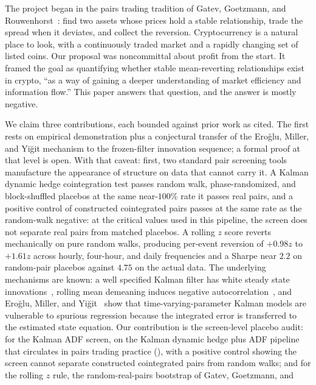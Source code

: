 \documentclass[11pt]{article}
\begin{document}
The project began in the pairs trading tradition of Gatev, Goetzmann, and
Rouwenhorst~\cite{gatev2006pairs}: find two assets whose prices hold a stable relationship, trade the
spread when it deviates, and collect the reversion. Cryptocurrency is a natural place to look,
with a continuously traded market and a rapidly changing set of listed coins. Our proposal was noncommittal about profit from the start. It framed the goal as quantifying whether stable mean-reverting
relationships exist in crypto, ``as a way of gaining a deeper understanding of market efficiency
and information flow.'' This paper answers that question, and the answer is mostly negative.

We claim three contributions, each bounded against prior work as cited. The first rests on
empirical demonstration plus a conjectural transfer of the Ero\u{g}lu, Miller, and Yi\u{g}it
mechanism to the frozen-filter innovation sequence; a formal proof at that level is
open. With that caveat: first, two standard pair screening tools manufacture the appearance of
structure on data that cannot carry it. A Kalman dynamic hedge cointegration test passes
random walk, phase-randomized, and block-shuffled placebos at the same near-$100\%$ rate it
passes real pairs, and a positive control of constructed cointegrated pairs passes at the
same rate as the random-walk negative: at the critical values used in this pipeline, the screen
does not separate real pairs from matched placebos. A rolling $z$ score reverts mechanically on pure random walks, producing
per-event reversion of $+0.98z$ to $+1.61z$ across hourly, four-hour, and daily frequencies
and a Sharpe near $2.2$ on random-pair placebos against $4.75$ on the actual data. The
underlying mechanisms are known: a well specified Kalman filter has white steady state
innovations~\cite{harvey1989structural}, rolling mean demeaning induces negative
autocorrelation~\cite{working1960correlation, cochrane1988random}, and Ero\u{g}lu, Miller,
and Yi\u{g}it~\cite{eroglu2022tvc} show that time-varying-parameter Kalman models are
vulnerable to spurious regression because the integrated error is transferred to the
estimated state equation. Our contribution is the screen-level placebo audit: for the
Kalman ADF screen, on the Kalman dynamic hedge plus ADF pipeline that circulates in pairs
trading practice (\cite{vidyamurthy2004pairs, elliott2005pairs,
triantafyllopoulos2011dynamic}), with a positive control showing the screen cannot
separate constructed cointegrated pairs from random walks; and for the rolling $z$ rule,
the random-real-pairs bootstrap of Gatev, Goetzmann, and
\end{document}
